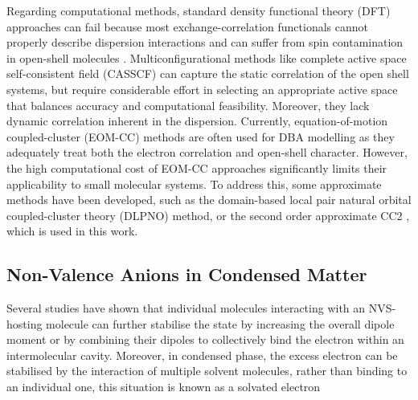 Regarding computational methods, standard density functional theory (DFT) approaches can fail because most exchange-correlation functionals cannot properly describe dispersion interactions and can suffer from spin contamination in open-shell molecules \cite{thiam2023accurately}. Multiconfigurational methods like complete active space self-consistent field (CASSCF)\cite{vila2002theoretical,ivanov2015anion} can capture the static correlation of the open shell systems, but require considerable effort in selecting an appropriate active space that balances accuracy and computational feasibility. Moreover, they lack dynamic correlation inherent in the dispersion. Currently, equation-of-motion coupled-cluster (EOM-CC)\cite{herbert2015quantum,jordan2003theory,moorby2024signatures} methods are often used for DBA modelling as they adequately treat both the electron correlation and open-shell character. However, the high computational cost of EOM-CC approaches significantly limits their applicability to small molecular systems. To address this, some approximate methods have been developed, such as the domain-based local pair natural orbital coupled-cluster theory (DLPNO) method\cite{haldar2020multilayer,schulz2018systematic}, or the second order approximate CC2 \cite{christiansen1995second,paran2024performance}, which is used in this work.\\

\subsection{Non-Valence Anions in Condensed Matter}

Several studies have shown that individual molecules interacting with an NVS-hosting molecule can further stabilise the state by increasing the overall dipole moment or by combining their dipoles to collectively bind the electron within an intermolecular cavity. Moreover, in condensed phase, the excess electron can be stabilised by the interaction of multiple solvent molecules, rather than binding to an individual one, this situation is known as a solvated electron \cite{schiedt1998anion,gutowski2002solvated,jordan2003theory,eustis2007photoelectron,simons2008molecular,herbert2015quantum,clarke2025role}\\


